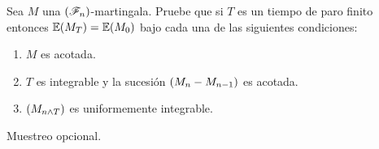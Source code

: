 \begin{problema}
Sea $M$ una $\left( \mathscr{F}_n\right) $-martingala. Pruebe que si $T$ es un tiempo de paro finito entonces $\mathbb{E}\! \left( M_T \right)=\mathbb{E}\! \left( M_0 \right)$ bajo cada una de las siguientes condiciones:
\begin{enumerate}
\item $M$ es acotada.
\item $T$ es integrable y la sucesi\'on $\left( M_n-M_{n-1}\right) $ es acotada.
\item $\left( M_{n\wedge T}\right) $ es uniformemente integrable. 
\end{enumerate}

 Muestreo opcional. 
\end{problema}